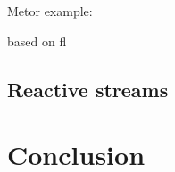 \documentclass[acmsmall]{acmart}\settopmatter{printfolios=true,printccs=false,printacmref=false}
\begin{document}
		Metor example: ~\cite{hochhaus2016meteor}

		based on fl

	\subsection{Reactive streams}

\section{Conclusion}



\end{document}
